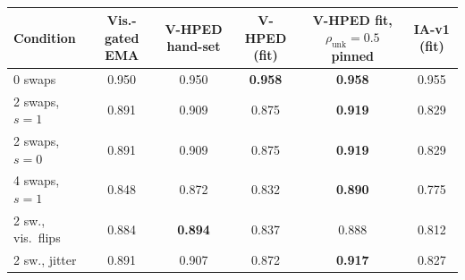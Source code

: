 \begin{tabular}{@{}lccccc@{}}
\toprule
Condition & Vis.-gated EMA & V-HPED hand-set & V-HPED (fit) & V-HPED fit, $\rho_{\mathrm{unk}}{=}0.5$ pinned & IA-v1 (fit) \\
\midrule
0 swaps & 0.950 & 0.950 & \textbf{0.958} & \textbf{0.958} & 0.955 \\
2 swaps, $s{=}1$ & 0.891 & 0.909 & 0.875 & \textbf{0.919} & 0.829 \\
2 swaps, $s{=}0$ & 0.891 & 0.909 & 0.875 & \textbf{0.919} & 0.829 \\
4 swaps, $s{=}1$ & 0.848 & 0.872 & 0.832 & \textbf{0.890} & 0.775 \\
2 sw., vis.\ flips & 0.884 & \textbf{0.894} & 0.837 & 0.888 & 0.812 \\
2 sw., jitter & 0.891 & 0.907 & 0.872 & \textbf{0.917} & 0.827 \\
\bottomrule
\end{tabular}
